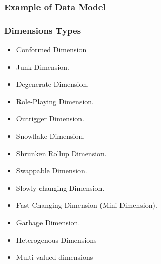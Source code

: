 \begin{frame}
    \frametitle{Example of Data Model}

    
\end{frame}

\begin{frame}
\frametitle{Dimensions Types}
	\begin{itemize}[<+->]
		\item Conformed Dimension
		\item Junk Dimension.
		\item Degenerate Dimension.
		\item Role-Playing Dimension.
		\item Outrigger Dimension.
		\item Snowflake Dimension.
		\item Shrunken Rollup Dimension.
		\item Swappable Dimension.
		\item Slowly changing Dimension.
		\item Fast Changing Dimension (Mini Dimension).
		\item Garbage Dimension.
		\item Heterogenous Dimensions
		\item Multi-valued dimensions
	\end{itemize}
\end{frame}

